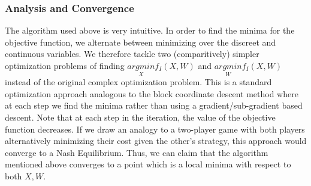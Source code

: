 \begin{algorithm}
\medskip{}



\medskip{}

\caption{$solve(I)$}
\end{algorithm}



\subsubsection*{Analysis and Convergence}

The algorithm used above is very intuitive. In order to find the minima
for the objective function, we alternate between minimizing over the
discreet and continuous variables. We therefore tackle two (comparitively)
simpler optimization problems of finding $\underset{X}{argmin}f_{I}(X,W)$
and $\underset{W}{argmin}f_{I}(X,W)$ instead of the original complex
optimization problem. This is a standard optimization approach analogous
to the block coordinate descent method where at each step we find
the minima rather than using a gradient/sub-gradient based descent.
Note that at each step in the iteration, the value of the objective
function decreases. If we draw an analogy to a two-player game with
both players alternatively minimizing their cost given the other's
strategy, this approach would converge to a Nash Equilibrium. Thus,
we can claim that the algorithm mentioned above converges to a point
which is a local minima with respect to both $X,W$.